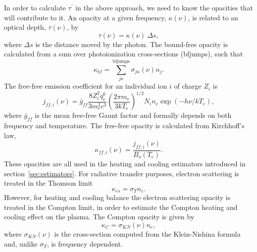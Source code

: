 In order to calculate $\tau^\prime$ in the above approach, we need
to know the opacities that will contribute to it. An opacity 
at a given frequency, $\kappa(\nu)$,
is related to an optical depth, $\tau(\nu)$, by
\begin{equation}
\tau(\nu) = \kappa(\nu)~\Delta s,
\end{equation}
where $\Delta s$ is the distance moved by the photon. The bound-free
opacity is calculated from a sum over photoionization cross-sections (bfjumps),
such that
\begin{equation}
\kappa_{bf} = \sum_{j\kappa}^{\mathrm{bfjumps}} \sigma_{j\kappa} (\nu) n_j.
\end{equation}
The free-free emission coefficient for an individual ion $i$ of charge $Z_i$ 
is \citep{gayet1970}
\begin{equation}
j_{ff,i} (\nu) = \bar{g}_{ff}\frac{8 Z_i^2 q_e^6}{3m_e^2 c^3}
\left( \frac{2\pi m_e}{3 k T_e} \right)^{1/2}
N_i n_e \exp(-h\nu/kT_e),
\label{eq:jff} 
\end{equation}
where $\bar{g}_{ff}$ is the mean free-free Gaunt factor and formally
depends on both frequency and temperature.
The free-free opacity is calculated from Kirchhoff's law, 
\begin{equation}
\kappa_{ff, i}(\nu) = \frac{j_{ff,i} (\nu)}{B_\nu (T_e)}.
\end{equation}
These opacities are all used in the heating and cooling estimators 
introduced in section~\ref{sec:estimators}.
For radiative transfer purposes, electron scattering is treated in the Thomson
limit
\begin{equation}
\kappa_{es} = \sigma_T n_e.
\end{equation}
However, for heating and cooling balance the electron scattering opacity 
is treated in the Compton limit, in order to estimate the Compton heating and cooling 
effect on the plasma. The Compton opacity is given by
\begin{equation}
\kappa_{C} = \sigma_{KN} (\nu) n_e,
\end{equation}
where $\sigma_{KN} (\nu)$ is the cross-section computed 
from the Klein-Nishina formula \citep{klein-nishina} and, unlike $\sigma_T$,
is frequency dependent.

